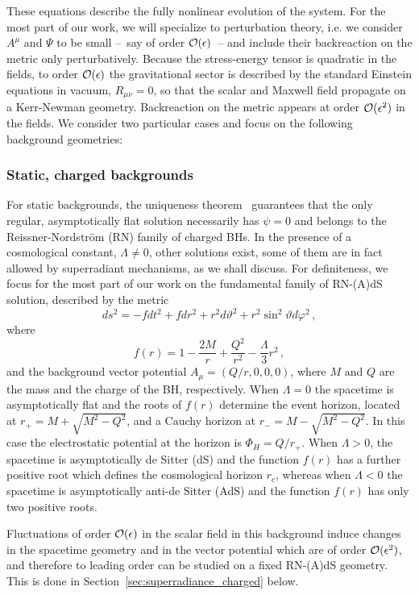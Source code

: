 \documentclass[11pt]{article}
\newcommand{\be}{\begin{equation}}
\newcommand{\ee}{\end{equation}}
\numberwithin{equation}{section} %
\begin{document}
These equations describe the fully nonlinear evolution of
the system. For the most part of our work, we will specialize to perturbation theory, i.e. we consider $A^\mu$ and $\Psi$ to be small --~say of order ${\cal O}(\epsilon)$~-- and include their backreaction on the metric only perturbatively. Because the stress-energy tensor is quadratic in the fields, to order ${\cal O}(\epsilon)$ the gravitational sector is described by the standard Einstein equations in vacuum, $R_{\mu\nu}=0$, so that the scalar and Maxwell field propagate on a Kerr-Newman geometry. Backreaction on the metric appears at order ${\cal O}(\epsilon^2)$ in the fields.
We consider two particular cases and focus on the following background geometries:
\subsubsection{Static, charged backgrounds}
For static backgrounds, the uniqueness theorem~\cite{uniqueness} guarantees that the only regular, asymptotically flat solution necessarily has $\psi=0$ and belongs to the Reissner-Nordstr\"om (RN) family of charged BHs. In the presence of a cosmological constant, $\Lambda\neq0$, other solutions exist, some of them are in fact allowed by superradiant mechanisms, as we shall discuss. For definiteness, we focus for the most part of our work on the fundamental family of RN-(A)dS solution, described by the metric 
%
\be
ds^2=-fdt^2+fdr^2+r^2d\vartheta^2+r^2\sin^2\vartheta d\varphi^2\,, 
\ee
%
where
%
\be
f(r)=1-\frac{2M}{r}+\frac{Q^2}{r^2}-\frac{\Lambda }{3}r^2\,, \label{RNLambda}
\ee
%
and the background vector potential $A_{\mu}=(Q/r,0,0,0)$, where $M$ and $Q$ are the mass and the charge of the BH, respectively.
When $\Lambda=0$ the spacetime is asymptotically flat and the roots of $f(r)$ determine the event horizon, located at $r_+=M+\sqrt{M^2-Q^2}$, and a Cauchy horizon at $r_-=M-\sqrt{M^2-Q^2}$. 
In this case the electrostatic potential at the horizon is $\Phi_H=Q/r_+$. When $\Lambda>0$, the spacetime is asymptotically de Sitter (dS) and the function $f(r)$ has a further positive root which defines the cosmological horizon $r_c$, whereas when $\Lambda<0$ the spacetime is asymptotically anti-de Sitter (AdS) and the function $f(r)$ has only two positive roots.


Fluctuations of order ${\cal O}(\epsilon)$ in the scalar field in this background induce changes in the spacetime geometry and in the vector potential which are of order ${\cal O}(\epsilon^2)$, and therefore to leading order can be studied on a fixed RN-(A)dS geometry. 
This is done in Section~\ref{sec:superradiance_charged} below.
\end{document}
